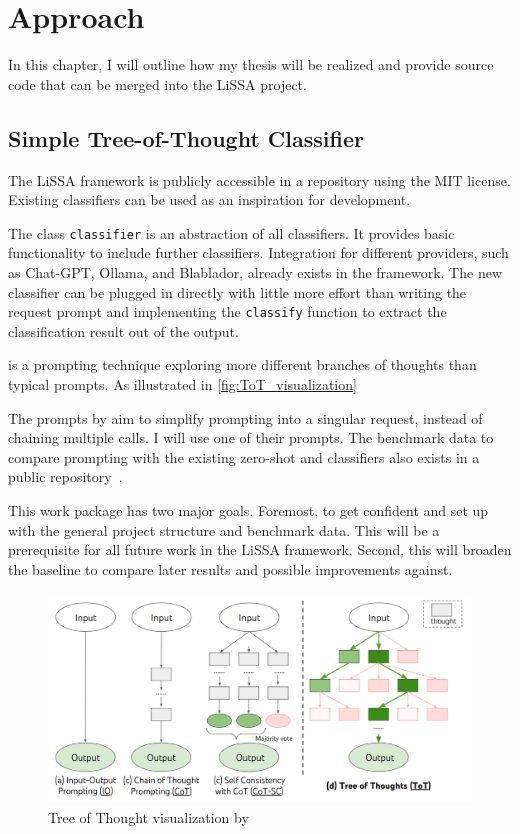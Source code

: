 \chapter{Approach}
In this chapter, I will outline how my thesis will be realized and provide source code that can be merged into the LiSSA project.


\section{Simple Tree-of-Thought Classifier}
\label{approach:sec:tot}
The LiSSA framework is publicly accessible in a repository using the MIT license.
Existing classifiers can be used as an inspiration for development.

The class \verb|classifier| is an abstraction of all classifiers.
It provides basic functionality to include further classifiers.
Integration for different \LLM providers, such as Chat-GPT, Ollama, and Blablador, already exists in the framework.
The new classifier can be plugged in directly with little more effort than writing the request prompt and implementing the \verb|classify| function to extract the classification result out of the \LLM output.

\ToT is a prompting technique exploring more different branches of thoughts than typical \CoT prompts.
As illustrated in \autoref{fig:ToT_visualization}

The prompts by  aim to simplify \ToT prompting into a singular request, instead of chaining multiple calls.
I will use one of their prompts.
The benchmark data to compare \ToT prompting with the existing zero-shot and \CoT classifiers also exists in a public repository~\cite{fuchss2022ArDoCoBenchmark}.

This work package has two major goals.
Foremost, to get confident and set up with the general project structure and benchmark data.
This will be a prerequisite for all future work in the LiSSA framework.
Second, this will broaden the baseline to compare later results and possible improvements against.

\begin{figure}
    \centering
    \includegraphics[width=\linewidth]{graphics/ToT_Yao}
    \caption{Tree of Thought visualization by }
    \label{fig:ToT_visualization}
\end{figure}


